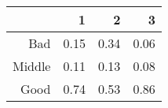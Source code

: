 \begin{table}[ht]
\centering
\begin{tabular}{rrrr}
  \hline
 & 1 & 2 & 3 \\ 
  \hline
Bad & 0.15 & 0.34 & 0.06 \\ 
  Middle & 0.11 & 0.13 & 0.08 \\ 
  Good & 0.74 & 0.53 & 0.86 \\ 
   \hline
\end{tabular}
\end{table}
